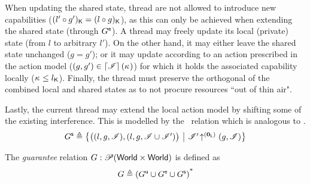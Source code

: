 %
%
When updating the shared state, thread are not allowed to introduce new capabilities ($(l' \circ g')_{\mathsf{K}}  = (l \circ g)_{\mathsf{K}}$), as this can only be achieved when extending the shared state (through $G^{\textsf{e}}$).
A thread may freely update its local (private) state (from $l$ to arbitrary $l'$). On the other hand, it may either leave the shared state unchanged ($g = g'$); or it may update according to an action prescribed in the action model ($(g, g') \in \left\lceil \mathscr{I}\right\rceil(\kappa_{})$) for which it holds the associated capability locally ($\kappa_{} \leq l_{\mathsf{K}}$). Finally, the thread must preserve the orthogonal of the combined local and shared states as to not procure resources ``out of thin air".

Lastly, the current thread may extend the local action model by shifting some of the existing interference. This is modelled by the \shiftG\ relation which is analogous to \shiftR.
%
\[
\shiftG \eqdef
\left\{
\begin{array}{@{} l @{\hspace*{5pt}} | @{\hspace*{5pt}} r @{}}
  \left(
  \begin{array}{@{} l @{}}
    (l, g, \lmod),
    \left( l, g, \lmod \cup \lmod'  \right)
  \end{array}
  \right)
  &
  \expandsAM{\lmod'}{\unitL}{g}{\lmod}
\end{array}
\right\}
\]

\begin{definition}[Guarantee]
The \emph{guarantee} relation $G: \mathscr{P} (\mathsf{World} \times \mathsf{World})$ is defined as
\[
G \triangleq  \left( G^{\textsf{u}} \cup G^{\textsf{e}} \cup G^{\textsf{s}} \right)^{\text{*}}
\]
\end{definition}

